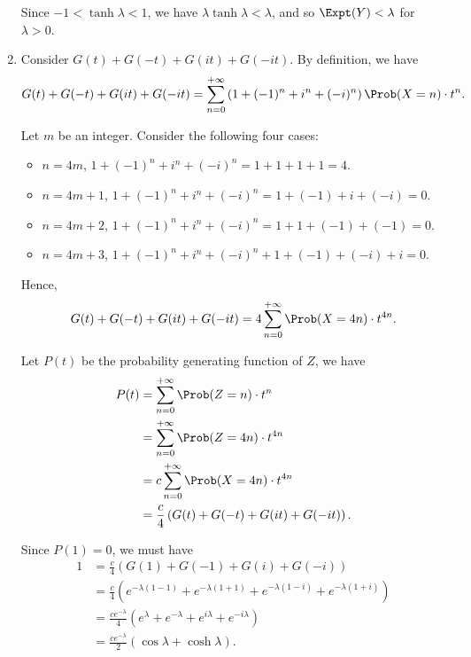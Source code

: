 \begin{enumerate}
          Since \(-1 < \tanh \lambda < 1\), we have \(\lambda \tanh \lambda < \lambda\), and so \(\Expt(Y) < \lambda\) for \(\lambda > 0\).

    \item Consider \(G(t) + G(-t) + G(it) + G(-it)\). By definition, we have
          \[
              G(t) + G(-t) + G(it) + G(-it) = \sum_{n = 0}^{+\infty} \left(1 + (-1)^n + i^n + (-i)^n\right) \Prob(X = n) \cdot t^n.
          \]

          Let \(m\) be an integer. Consider the following four cases:
          \begin{itemize}
              \item \(n = 4m\), \(1 + (-1)^n + i^n + (-i)^n = 1 + 1 + 1 + 1 = 4\).
              \item \(n = 4m + 1\), \(1 + (-1)^n + i^n + (-i)^n = 1 + (-1) + i + (-i) = 0\).
              \item \(n = 4m + 2\), \(1 + (-1)^n + i^n + (-i)^n = 1 + 1 + (-1) + (-1) = 0\).
              \item \(n = 4m + 3\), \(1 + (-1)^n + i^n + (-i)^n + 1 + (-1) + (-i) + i = 0\).
          \end{itemize}

          Hence,
          \[
              G(t) + G(-t) + G(it) + G(-it) = 4 \sum_{n = 0}^{+\infty} \Prob(X = 4n) \cdot t^{4n}.
          \]

          Let \(P(t)\) be the probability generating function of \(Z\), we have
          \begin{align*}
              P(t) & = \sum_{n = 0}^{+\infty} \Prob(Z = n) \cdot t^n           \\
                   & = \sum_{n = 0}^{+\infty} \Prob(Z = 4n) \cdot t^{4n}       \\
                   & = c \sum_{n = 0}^{+\infty} \Prob(X = 4n) \cdot t^{4n}     \\
                   & = \frac{c}{4} \left(G(t) + G(-t) + G(it) + G(-it)\right).
          \end{align*}

          Since \(P(1) = 0\), we must have
          \begin{align*}
              1 & = \frac{c}{4} \left(G(1) + G(-1) + G(i) + G(-i)\right)                                                               \\
                & = \frac{c}{4} \left(e^{-\lambda (1 - 1)} + e^{-\lambda (1 + 1)} + e^{-\lambda (1 - i)} + e^{-\lambda (1 + i)}\right) \\
                & = \frac{ce^{-\lambda}}{4} \left(e^{\lambda} + e^{-\lambda} + e^{i\lambda} + e^{-i\lambda}\right)                     \\
                & = \frac{c e^{-\lambda}}{2} \left(\cos \lambda + \cosh \lambda\right).
          \end{align*}


\end{enumerate}
